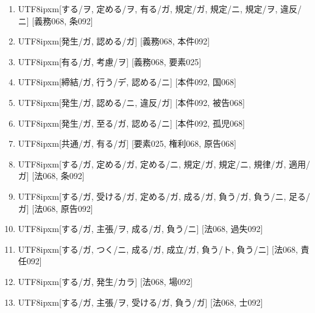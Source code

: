 \begin{enumerate}
\item \begin{CJK}{UTF8}{ipxm}[する/ヲ, 定める/ヲ, 有る/ガ, 規定/ガ, 規定/ニ, 規定/ヲ, 違反/ニ] [義務068, 条092]\end{CJK}
\item \begin{CJK}{UTF8}{ipxm}[発生/ガ, 認める/ガ] [義務068, 本件092]\end{CJK}
\item \begin{CJK}{UTF8}{ipxm}[有る/ガ, 考慮/ヲ] [義務068, 要素025]\end{CJK}
\item \begin{CJK}{UTF8}{ipxm}[締結/ガ, 行う/デ, 認める/ニ] [本件092, 国068]\end{CJK}
\item \begin{CJK}{UTF8}{ipxm}[発生/ガ, 認める/ニ, 違反/ガ] [本件092, 被告068]\end{CJK}
\item \begin{CJK}{UTF8}{ipxm}[発生/ガ, 至る/ガ, 認める/ニ] [本件092, 孤児068]\end{CJK}
\item \begin{CJK}{UTF8}{ipxm}[共通/ガ, 有る/ガ] [要素025, 権利068, 原告068]\end{CJK}
\item \begin{CJK}{UTF8}{ipxm}[する/ガ, 定める/ガ, 定める/ニ, 規定/ガ, 規定/ニ, 規律/ガ, 適用/ガ] [法068, 条092]\end{CJK}
\item \begin{CJK}{UTF8}{ipxm}[する/ガ, 受ける/ガ, 定める/ガ, 成る/ガ, 負う/ガ, 負う/ニ, 足る/ガ] [法068, 原告092]\end{CJK}
\item \begin{CJK}{UTF8}{ipxm}[する/ガ, 主張/ヲ, 成る/ガ, 負う/ニ] [法068, 過失092]\end{CJK}
\item \begin{CJK}{UTF8}{ipxm}[する/ガ, つく/ニ, 成る/ガ, 成立/ガ, 負う/ト, 負う/ニ] [法068, 責任092]\end{CJK}
\item \begin{CJK}{UTF8}{ipxm}[する/ガ, 発生/カラ] [法068, 場092]\end{CJK}
\item \begin{CJK}{UTF8}{ipxm}[する/ガ, 主張/ヲ, 受ける/ガ, 負う/ガ] [法068, 士092]\end{CJK}

\end{enumerate}
